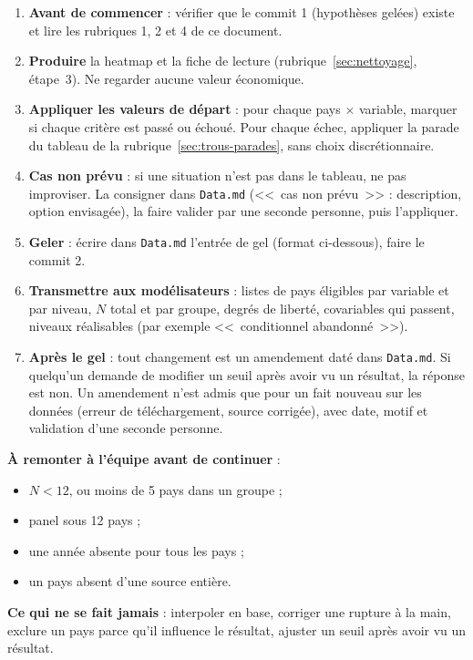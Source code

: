 \documentclass[21pt,a4paper]{article}
\begin{document}
	\begin{enumerate}
		\item \textbf{Avant de commencer} : vérifier que le commit 1 (hypothèses gelées) existe et lire les rubriques 1, 2 et 4 de ce document.
		\item \textbf{Produire} la heatmap et la fiche de lecture (rubrique~\ref{sec:nettoyage}, étape~3). Ne regarder aucune valeur économique.
		\item \textbf{Appliquer les valeurs de départ} : pour chaque pays $\times$ variable, marquer si chaque critère est passé ou échoué. Pour chaque échec, appliquer la parade du tableau de la rubrique~\ref{sec:trous-parades}, sans choix discrétionnaire.
		\item \textbf{Cas non prévu} : si une situation n'est pas dans le tableau, ne pas improviser. La consigner dans \texttt{Data.md} (<<~cas non prévu~>> : description, option envisagée), la faire valider par une seconde personne, puis l'appliquer.
		\item \textbf{Geler} : écrire dans \texttt{Data.md} l'entrée de gel (format ci-dessous), faire le commit 2.
		\item \textbf{Transmettre aux modélisateurs} : listes de pays éligibles par variable et par niveau, $N$ total et par groupe, degrés de liberté, covariables qui passent, niveaux réalisables (par exemple <<~conditionnel abandonné~>>).
		\item \textbf{Après le gel} : tout changement est un amendement daté dans \texttt{Data.md}. Si quelqu'un demande de modifier un seuil après avoir vu un résultat, la réponse est non. Un amendement n'est admis que pour un fait nouveau sur les données (erreur de téléchargement, source corrigée), avec date, motif et validation d'une seconde personne.
	\end{enumerate}
	
	\textbf{À remonter à l'équipe avant de continuer} :
	\begin{itemize}
		\item $N < 12$, ou moins de 5 pays dans un groupe ;
		\item panel sous 12 pays ;
		\item une année absente pour tous les pays ;
		\item un pays absent d'une source entière.
	\end{itemize}
	
	\textbf{Ce qui ne se fait jamais} : interpoler en base, corriger une rupture à la main, exclure un pays parce qu'il influence le résultat, ajuster un seuil après avoir vu un résultat.
	
\end{document}
